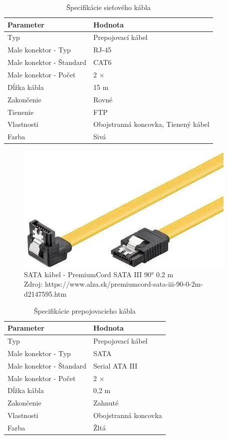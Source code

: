 \documentclass[12pt,oneside,slovak,a4paper]{article}
\begin{document}
\begin{table}[h]
\centering
\begin{tabular}{|l|l|}
\hline
\textbf{Parameter} & \textbf{Hodnota} \\ \hline
Typ & Prepojovací kábel \\ \hline
Male konektor - Typ & RJ-45 \\ \hline
Male konektor - Štandard & CAT6 \\ \hline
Male konektor - Počet & 2 × \\ \hline
Dĺžka kábla & 15 m \\ \hline
Zakončenie & Rovné \\ \hline
Tienenie & FTP \\ \hline
Vlastnosti & Obojstranná koncovka, Tienený kábel \\ \hline
Farba & Sivá \\ \hline
\end{tabular}
\caption{Špecifikácie sieťového kábla}
\end{table}

\begin{figure}[H]
	\centering
	\captionsetup{justification=centering,margin=2cm}
	\includegraphics[scale=0.4]{./images/sata.png} %
	\centering
	\caption{SATA kábel - PremiumCord SATA III 90° 0.2 m \\ Zdroj: https://www.alza.sk/premiumcord-sata-iii-90-0-2m-d2147595.htm}
\end{figure}

\begin{table}[h]
\centering
\begin{tabular}{|l|l|}
\hline
\textbf{Parameter} & \textbf{Hodnota} \\ \hline
Typ & Prepojovací kábel \\ \hline
Male konektor - Typ & SATA \\ \hline
Male konektor - Štandard & Serial ATA III \\ \hline
Male konektor - Počet & 2 × \\ \hline
Dĺžka kábla & 0,2 m \\ \hline
Zakončenie & Zahnuté \\ \hline
Vlastnosti & Obojstranná koncovka \\ \hline
Farba & Žltá \\ \hline
\end{tabular}
\caption{Špecifikácie prepojovacieho kábla}
\end{table}
\end{document}
